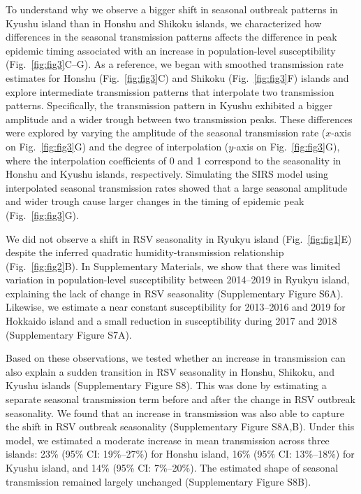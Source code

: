 \documentclass[12pt]{article}
\newcommand{\fref}[1]{Fig.~\ref{fig:#1}}
\begin{document}
To understand why we observe a bigger shift in seasonal outbreak patterns in Kyushu island than in Honshu and Shikoku islands, we characterized how differences in the seasonal transmission patterns affects the difference in peak epidemic timing associated with an increase in population-level susceptibility (\fref{fig3}C--G).
As a reference, we began with smoothed transmission rate estimates for Honshu (\fref{fig3}C) and Shikoku (\fref{fig3}F) islands and explore intermediate transmission patterns that interpolate two transmission patterns.
Specifically, the transmission pattern in Kyushu exhibited a bigger amplitude and a wider trough between two transmission peaks.
These differences were explored by varying the amplitude of the seasonal transmission rate ($x$-axis on \fref{fig3}G) and the degree of interpolation ($y$-axis on \fref{fig3}G), where the interpolation coefficients of 0 and 1 correspond to the seasonality in Honshu and Kyushu islands, respectively.
Simulating the SIRS model using interpolated seasonal transmission rates showed that a large seasonal amplitude and wider trough cause larger changes in the timing of epidemic peak (\fref{fig3}G). 

We did not observe a shift in RSV seasonality in Ryukyu island (\fref{fig1}E) despite the inferred quadratic humidity-transmission relationship (\fref{fig2}B).
In Supplementary Materials, we show that there was limited variation in population-level susceptibility between 2014--2019 in Ryukyu island, explaining the lack of change in RSV seasonality (Supplementary Figure S6A).
Likewise, we estimate a near constant susceptibility for 2013--2016 and 2019 for Hokkaido island and a small reduction in susceptibility during 2017 and 2018 (Supplementary Figure S7A).

Based on these observations, we tested whether an increase in transmission can also explain a sudden transition in RSV seasonality in Honshu, Shikoku, and Kyushu islands (Supplementary Figure S8). 
This was done by estimating a separate seasonal transmission term before and after the change in RSV outbreak seasonality.
We found that an increase in transmission was also able to capture the shift in RSV outbreak seasonality (Supplementary Figure S8A,B).
Under this model, we estimated a moderate increase in mean transmission across three islands: 23\% (95\% CI: 19\%--27\%) for Honshu island, 16\% (95\% CI: 13\%--18\%) for Kyushu island, and 14\% (95\% CI: 7\%--20\%).
The estimated shape of seasonal transmission remained largely unchanged (Supplementary Figure S8B).
\end{document}
